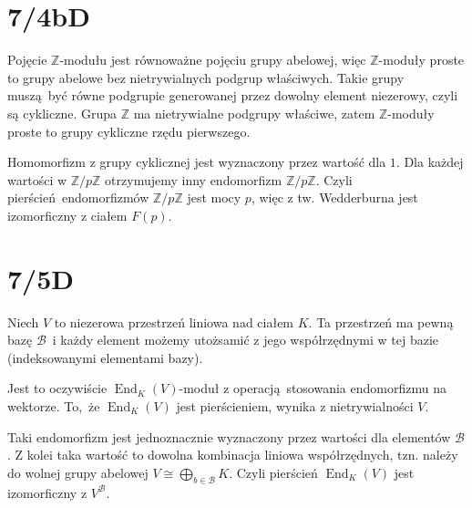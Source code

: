 \documentclass[a4paper, 12pt]{article}
\title{}
\author{Wiktor Kuchta}
\date{\vspace{-4ex}}
\DeclareMathOperator{\End}{End}
\newcommand{\+}{\enspace}
\begin{document}
\maketitle

\iffalse
\section*{7/1}
Załóżmy, że $a_0, …, a_{n-1} ∈ ℝ$ są algebraicznie niezależne (nad $ℚ$).
Udowodnić, że wielomian
$$W(X) = X^n + a_{n-1}X^{n-1} + … + a_1X + a_0$$
jest nierozkładalny nad ciałem $ℚ(a_0,…,a_{n-1})$.

\section*{7/2}
Załóżmy, że $a,b,c ∈ ℝ$ są algebraicznie niezależne.
To oznacza, że homomorfizm ewaluacji w $(a,b,c)$ ma trywialne jądro.

Niech $g_1(X) =
Algebraiczna niezależność $a^2+b+c, b^2c, ab+ac^2$ oznacza,
że
ewaluacja $
\fi

\section*{7/4bD}
Pojęcie $ℤ$-modułu jest równoważne pojęciu grupy abelowej,
więc $ℤ$-moduły proste to grupy abelowe
bez nietrywialnych podgrup właściwych.
Takie grupy muszą być równe podgrupie generowanej
przez dowolny element niezerowy, czyli są cykliczne.
Grupa $ℤ$ ma nietrywialne podgrupy właściwe, zatem $ℤ$-moduły proste
to grupy cykliczne rzędu pierwszego.

Homomorfizm z grupy cyklicznej jest wyznaczony przez wartość dla $1$.
Dla każdej wartości w $ℤ/pℤ$ otrzymujemy inny endomorfizm $ℤ/pℤ$.
Czyli pierścień endomorfizmów $ℤ/pℤ$ jest mocy $p$, więc z tw.
Wedderburna jest izomorficzny z ciałem $F(p)$.

\section*{7/5D}
Niech $V$ to niezerowa przestrzeń liniowa nad ciałem $K$.
Ta przestrzeń ma pewną bazę $\mathcal{B}$ i każdy element możemy utożsamić
z jego współrzędnymi w tej bazie (indeksowanymi elementami bazy).

Jest to oczywiście $\End_K(V)$-moduł z operacją stosowania endomorfizmu na
wektorze.
To, że $\End_K(V)$ jest pierścieniem, wynika z nietrywialności $V$.

Taki endomorfizm jest jednoznacznie wyznaczony przez wartości dla elementów
$\mathcal{B}$.
Z kolei taka wartość to dowolna kombinacja liniowa współrzędnych, tzn.
należy do wolnej grupy abelowej $V ≅ \bigoplus_{b∈\mathcal{B}} K$.
Czyli pierścień $\End_K(V)$ jest izomorficzny z $V^{\mathcal{B}}$.
\end{document}

